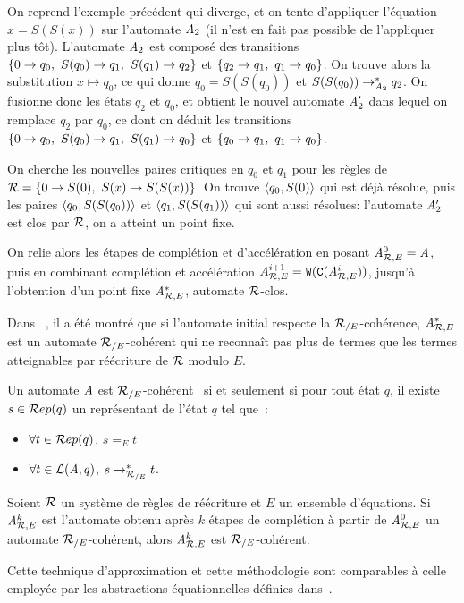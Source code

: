 \begin{example}
  On reprend l'exemple précédent qui diverge, et on tente d'appliquer l'équation $x = S(S(x))$ sur
  l'automate $\mathit A_2$ (il n'est en fait pas possible de l'appliquer plus tôt).
  L'automate $\mathit A_2$ est composé des transitions $\{ 0 \rightarrow q_0,\ S(q_0) \rightarrow q_1,\ S(q_1) \rightarrow q_2\}$
  et $\{ q_2 \rightarrow q_1,\ q_1 \rightarrow q_0\}$.
  On trouve alors la substitution $x \mapsto q_0$, ce qui donne $q_0 = S(S(q_0))$ et $S(S(q_0)) \rightarrow^*_{\mathit A_2} q_2$.
  On fusionne donc les états $q_2$ et $q_0$, et obtient le nouvel automate $\mathit A_2'$ dans lequel on remplace
  $q_2$ par $q_0$, ce dont on déduit les transitions $\{ 0 \rightarrow q_0,\ S(q_0) \rightarrow q_1,\ S(q_1) \rightarrow q_0\}$
  et $\{ q_0 \rightarrow q_1,\ q_1 \rightarrow q_0\}$.
  
  On cherche les nouvelles paires critiques en $q_0$ et $q_1$ pour les règles de $\mathcal R = \{0 \rightarrow S(0),\ S(x) \rightarrow S(S(x))\}$.
  On trouve $\langle q_0, S(0)\rangle$ qui est déjà résolue, puis les paires $\langle q_0,S(S(q_0))\rangle$ et $\langle q_1,S(S(q_1))\rangle$
  qui sont aussi résolues: l'automate $\mathit A_2'$ est clos par $\mathcal R$, on a atteint un point fixe.
\end{example}


On relie alors les étapes de complétion et d'accélération en posant ${\mathit A}_{\mathcal R,E}^0=\mathit A$, puis en combinant
complétion et accélération ${\mathit A}_{\mathcal R,E}^{i+1}= \mathtt{W}(\mathtt{C}({\mathit A}_{\mathcal R,E}^i))$, jusqu'à l'obtention d'un point fixe
$\mathit A^*_{\mathcal R,E}$, automate $\mathcal R$-clos.

Dans ~\cite{GenetR-JSC10}, il a été montré que si l'automate initial respecte la ${\mathcal R_{/E}}$-cohérence,
$\mathit A^*_{\mathcal R,E}$ est un automate ${\mathcal R_{/E}}$-cohérent qui ne reconnaît pas plus de termes que les termes atteignables
par réécriture de $\mathcal R$ modulo $E$.
\begin{definition}
  \label{def:re-coherence}
  Un automate $\mathit A$ est ${\mathcal R_{/E}}$-cohérent~\cite{GenetR-JSC10} si et seulement si pour tout état $q$, il existe 
  $s \in \mathcal R ep(q)$ un représentant de l'état $q$ tel que~:
  \begin{itemize}
  \item $\forall t \in \mathcal R ep(q)$, $s =_E t$
  \item $\forall t \in \mathcal{L}(\mathit A, q)$, $s \rightarrow_{\mathcal R_{/E}}^* t$.
  \end{itemize}
\end{definition}

\begin{theorem}
  \label{thm:re-coherence}
  Soient $\mathcal R$ un système de règles de réécriture et $E$ un ensemble d'équations.
  Si ${\mathit A}_{\mathcal R,E}^k$ est l'automate obtenu après $k$ étapes de complétion à partir de
  ${\mathit A}_{\mathcal R,E}^0$ un automate ${\mathcal R_{/E}}$-cohérent, alors ${\mathit A}_{\mathcal R,E}^k$ est ${\mathcal R_{/E}}$-cohérent.
\end{theorem}
Cette technique d'approximation et cette méthodologie sont comparables à celle employée 
par les abstractions équationnelles définies dans~\cite{MeseguerPM-TCS08}.

